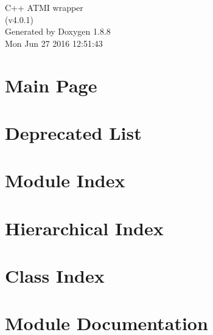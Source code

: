 \documentclass[twoside]{book}
\newcommand{\+}{\discretionary{\mbox{\scriptsize$\hookleftarrow$}}{}{}}
\newcommand{\clearemptydoublepage}{%
  \newpage{\pagestyle{empty}\cleardoublepage}%
}
\begin{document}
\hypersetup{pageanchor=false,
             bookmarks=true,
             bookmarksnumbered=true,
             pdfencoding=unicode
            }
\begin{titlepage}
\vspace*{7cm}
\begin{center}%
{\Large C++ A\+T\+M\+I wrapper \\[1ex]\large (v4.\+0.\+1) }\\
\vspace*{1cm}
{\large Generated by Doxygen 1.8.8}\\
\vspace*{0.5cm}
{\small Mon Jun 27 2016 12:51:43}\\
\end{center}
\end{titlepage}
\clearemptydoublepage
\tableofcontents
\clearemptydoublepage
{}
\hypersetup{pageanchor=true}

\chapter{Main Page}
\label{index}\hypertarget{index}{}
\chapter{Deprecated List}
\label{deprecated}
\hypertarget{deprecated}{}

\chapter{Module Index}

\chapter{Hierarchical Index}

\chapter{Class Index}

\chapter{Module Documentation}





\end{document}
